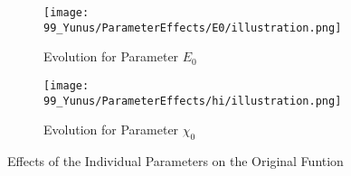 \begin{figure}
    \centering
    \begin{subfigure}{0.4\textwidth}
        \texttt{[image: 99\_Yunus/ParameterEffects/E0/illustration.png]}
        \caption{Evolution for Parameter $E_0$}
        \label{fig:yunus.function.evolution.e0}
    \end{subfigure}
    \begin{subfigure}{0.4\textwidth}
        \texttt{[image: 99\_Yunus/ParameterEffects/hi/illustration.png]}
        \caption{Evolution for Parameter $\chi_0$}
        \label{fig:yunus.function.evolution.hi}
    \end{subfigure}
    \caption{Effects of the Individual Parameters on the Original Funtion}
\end{figure}
